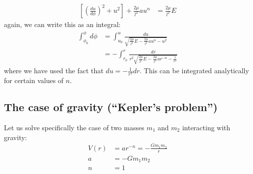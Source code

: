 \begin{align}
\left[\left( \frac{du}{d\phi} \right)^2+u^2\right]+\frac{2\mu}{l^2}au^n&=\frac{2\mu}{l^2}E
\end{align}
again, we can write this as an integral:
\begin{align}
\int_{\phi_0}^\phi d\phi&=\int_{u_0}^u \frac{du}{\sqrt{\frac{2\mu}{l^2}E-\frac{2\mu}{l^2}au^n-u^2}}\nonumber\\
&=-\int_{r_0}^r \frac{dr}{r^2\sqrt{\frac{2\mu}{l^2}E-\frac{2\mu}{l^2}ar^{-n}-\frac{1}{r^2}}}
\end{align}
where we have used the fact that $du=-\frac{1}{r^2}dr$. This can be integrated analytically for certain values of $n$. 

\subsection{The case of gravity (``Kepler's problem'')}
Let us solve specifically the case of two masses $m_1$ and $m_2$ interacting with gravity:
\begin{align}
V(r)&=ar^{-n}=-\frac{Gm_1m_2}{r}\nonumber\\
a&=-Gm_1m_2\nonumber\\
n&=1
\end{align}

